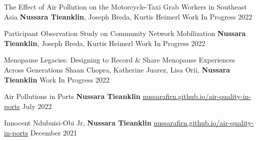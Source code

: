 

\begin{cventries}

\cvpub
    {The Effect of Air Pollution on the Motorcycle-Taxi Grab Workers in Southeast Asia} %
    {\textbf{Nussara Tieanklin}, Joseph Breda, Kurtis Heimerl} %
    {Work In Progress} %
    {2022} %


\cvpub
    {Participant Observation Study on Community Network Mobilization} %
    {\textbf{Nussara Tieanklin}, Joseph Breda, Kurtis Heimerl} %
    {Work In Progress} %
    {2022} %
   
   

\cvpub
    {Menopause Legacies: Designing to Record \& Share Menopause Experiences Across Generations} %
    {Shaan Chopra, Katherine Juarez, Lisa Orii, \textbf{Nussara Tieanklin}} %
    {Work In Progress} %
    {2022} %
   


\cvpub
    {Air Pollutions in Ports} %
    {\textbf{Nussara Tieanklin}} %
    { \href{https://nussarafirn.github.io/air-quality-in-ports}{nussarafirn.github.io/air-quality-in-ports}} %
    {July 2022} %

\cvpub
    {} %
    {Innocent Ndubuisi-Obi Jr, \textbf{Nussara Tieanklin}} %
    { \href{https://nussarafirn.github.io/air-quality-in-ports}{nussarafirn.github.io/air-quality-in-ports}} %
    {December 2021} %



\end{cventries}
